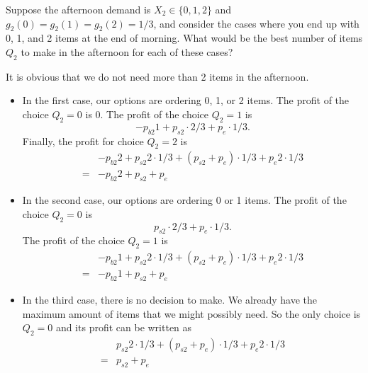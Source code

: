 \begin{question}
Suppose the afternoon demand is $X_2\in \{0,1,2\}$ and $g_2(0)=g_2(1)=g_2(2)=1/3$, and consider the cases where you end up with 0, 1, and 2 items at the end of morning. What would be the best number of items $Q_2$ to make in the afternoon for each of these cases?

\begin{solution}
	It is obvious that we do not need more than 2 items in the afternoon. 
	
	\begin{itemize}
	
	\item In the first case, our options are ordering 0, 1, or 2 items. The profit of the choice $Q_2=0$ is 0. The profit of the choice $Q_2=1$ is 
    \begin{equation*}
    -p_{b2} 1 + p_{s2} \cdot 2/3 + p_e \cdot 1/3. 
  \end{equation*}
Finally, the profit for choice $Q_2=2$ is 
    \begin{align*}
    & -p_{b2} 2 + p_{s2} 2 \cdot 1/3 + (p_{s2} + p_e) \cdot 1/3 + p_e 2 \cdot 1/3 \\
  = & -p_{b2} 2 + p_{s2} + p_e
  \end{align*}
  

	\item In the second case, our options are ordering 0 or 1 items. The profit of the choice $Q_2=0$ is 
    \begin{equation*}
    p_{s2} \cdot 2/3 + p_e \cdot 1/3. 
  	\end{equation*}
The profit of the choice $Q_2=1$ is
    \begin{align*}
    & -p_{b2} 1 + p_{s2} 2 \cdot 1/3 + (p_{s2} + p_e) \cdot 1/3 + p_e 2 \cdot 1/3 \\
  = & -p_{b2} 1 + p_{s2} + p_e
  \end{align*}
  
  \item In the third case, there is no decision to make. We already have the maximum amount of items that we might possibly need. So the only choice is $Q_2=0$ and its profit can be written as
    \begin{align*}
    & p_{s2} 2 \cdot 1/3 + (p_{s2} + p_e) \cdot 1/3 + p_e 2 \cdot 1/3 \\
  = & p_{s2} + p_e
  \end{align*}  
	\end{itemize}
\end{solution}
\end{question}


